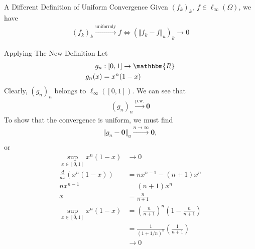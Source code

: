 \documentclass[10pt]{extarticle}
\renewcommand{\mathbf}[1]{\mathbold{#1}}
\newcommand{\R}{\mathbbm{R}}
\begin{document}
  \begin{problem}{A Different Definition of Uniform Convergence}
    Given $(f_k)_k,~f \in \ell_{\infty}(\Omega)$, we have
    \begin{align*}
      (f_k)_k \xrightarrow{\text{uniformly}} f \Leftrightarrow \left(\Vert f_k - f \Vert_u\right)_k \rightarrow 0
    \end{align*}
  \end{problem}
  \begin{problem}{Applying The New Definition}
    Let
    \begin{align*}
      g_n&: [0,1] \rightarrow \R\\
      g_n(x) &= x^n(1-x)
    \end{align*}
    Clearly, $(g_n)_n$ belongs to $\ell_{\infty}([0,1])$. We can see that
    \begin{align*}
      (g_n)_n \xrightarrow{\text{p.w.}} \mathbf{0}
    \end{align*}
    To show that the convergence is uniform, we must find 
    \begin{align*}
      \Vert g_n - \mathbf{0}\Vert_u \xrightarrow{n\rightarrow\infty} \mathbf{0},\\
    \end{align*}
    or
    \begin{align*}
      \sup_{x\in[0,1]}x^n(1-x)&\rightarrow 0\\
      \frac{d}{dx}(x^n(1-x)) &= nx^{n-1} - (n+1)x^n\\
      nx^{n-1} &= (n+1)x^n\\
      x &= \frac{n}{n+1}\\
      \sup_{x\in[0,1]}x^n(1-x) &= \left(\frac{n}{n+1}\right)^n\left(1-\frac{n}{n+1}\right)\\
                               &= \frac{1}{(1+1/n)^n}\left(\frac{1}{n+1}\right)\\
                               &\rightarrow 0
    \end{align*}
  \end{problem}
\end{document}
